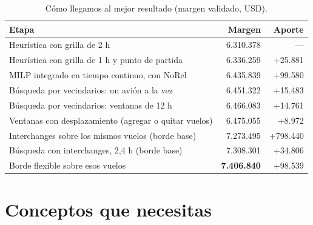 \documentclass[11pt,a4paper]{article}
\begin{document}
\begin{table}[h]
\centering
\caption{Cómo llegamos al mejor resultado (margen validado, USD).}
\begin{tabular}{lrr}
\toprule
Etapa & Margen & Aporte \\
\midrule
Heurística con grilla de 2 h & 6.310.378 & --- \\
Heurística con grilla de 1 h y punto de partida & 6.336.259 & +25.881 \\
MILP integrado en tiempo continuo, con NoRel & 6.435.839 & +99.580 \\
Búsqueda por vecindarios: un avión a la vez & 6.451.322 & +15.483 \\
Búsqueda por vecindarios: ventanas de 12 h & 6.466.083 & +14.761 \\
Ventanas con desplazamiento (agregar o quitar vuelos) & 6.475.055 & +8.972 \\
Interchanges sobre los mismos vuelos (borde base) & 7.273.495 & +798.440 \\
Búsqueda con interchanges, 2,4 h (borde base) & 7.308.301 & +34.806 \\
Borde flexible sobre esos vuelos & \textbf{7.406.840} & +98.539 \\
\bottomrule
\end{tabular}
\end{table}

\section{Conceptos que necesitas}
\end{document}
